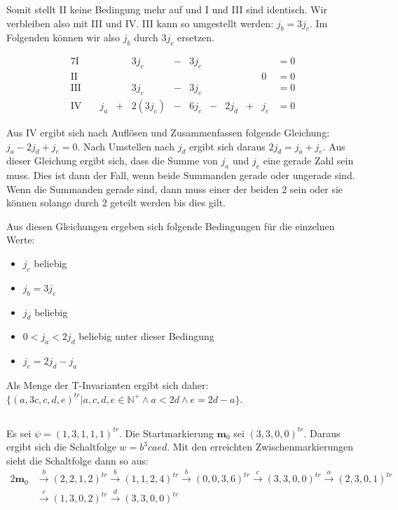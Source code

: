 \documentclass[10pt,a4paper,oneside,ngerman,numbers=noenddot]{scrartcl}
\begin{document}
Somit stellt II keine Bedingung mehr auf und I und III sind identisch. Wir verbleiben also mit III und IV. III kann so umgestellt werden: \(j_b = 3j_c\). Im Folgenden können wir also \(j_b\) durch \(3j_c\) ersetzen.

\begin{alignat*}{7}
	\text{I} && && 3j_c &-& 3j_c && && &= 0 \\
	\text{II} && && && && && 0 &= 0 \\
	\text{III} && && 3j_c &-& 3j_c && && &= 0 \\
	\text{IV} && \; j_a &+& 2(3j_c) &-& 6j_c &-& 2j_d &+& j_e &= 0
\end{alignat*}

Aus IV ergibt sich nach Auflösen und Zusammenfassen folgende Gleichung: \(j_a - 2j_d + j_e = 0\). Nach Umstellen nach \(j_d\) ergibt sich daraus \(2j_d = j_a + j_e\). Aus dieser Gleichung ergibt sich, dass die Summe von \(j_a\) und \(j_e\) eine gerade Zahl sein muss. Dies ist dann der Fall, wenn beide Summanden gerade oder ungerade sind. Wenn die Summanden gerade sind, dann muss einer der beiden 2 sein oder sie können solange durch 2 geteilt werden bis dies gilt.

Aus diesen Gleichungen ergeben sich folgende Bedingungen für die einzelnen Werte:
\begin{itemize}
	\item \(j_c\) beliebig
	\item \(j_b = 3j_c\)
	\item \(j_d\) beliebig
	\item \(0 < j_a < 2j_d\) beliebig unter dieser Bedingung
	\item \(j_e = 2j_d - j_a\)
\end{itemize}

Als Menge der T-Invarianten ergibt sich daher: \(\{(a,3c,c,d,e)^{tr} | a,c,d,e \in \mathbb{N}^+ \wedge a < 2d \wedge e = 2d -a\}\).

\subsection{}
Es sei \(\psi = (1, 3, 1, 1, 1)^{tr}\). Die Startmarkierung \(\textbf{m}_0\) sei \((3, 3, 0, 0)^{tr}\). Daraus ergibt sich die Schaltfolge \(w = b^3caed\). Mit den erreichten Zwischenmarkierungen sieht die Schaltfolge dann so aus:
\begin{alignat*}{2}
	\textbf{m}_0 &\overset{b}{\rightarrow} (2, 2, 1, 2)^{tr} \overset{b}{\rightarrow} (1, 1, 2, 4)^{tr} \overset{b}{\rightarrow} (0, 0, 3, 6)^{tr} \overset{c}{\rightarrow} (3, 3, 0, 0)^{tr} \overset{a}{\rightarrow} (2, 3, 0, 1)^{tr} \\
	&\overset{e}{\rightarrow} (1, 3, 0, 2)^{tr} \overset{d}{\rightarrow} (3, 3, 0, 0)^{tr}
\end{alignat*}
\section{} %
\section{} %
\end{document}

